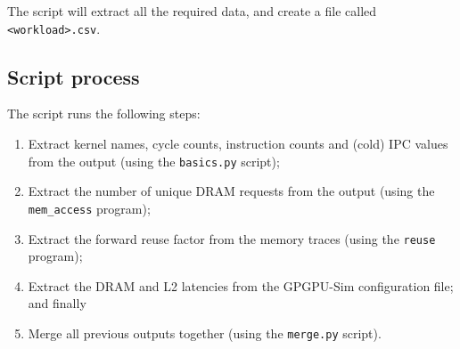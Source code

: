 The script will extract all the required data, and create a file called \verb|<workload>.csv|.

\subsection{Script process}\label{subsec:script-process}
The script runs the following steps:
\begin{enumerate}
    \item Extract kernel names, cycle counts, instruction counts and (cold) IPC values from the output (using the \verb|basics.py| script);
    \item Extract the number of unique DRAM requests from the output (using the \verb|mem_access| program);
    \item Extract the forward reuse factor from the memory traces (using the \verb|reuse| program);
    \item Extract the DRAM and L2 latencies from the GPGPU-Sim configuration file; and finally
    \item Merge all previous outputs together (using the \verb|merge.py| script).
\end{enumerate}